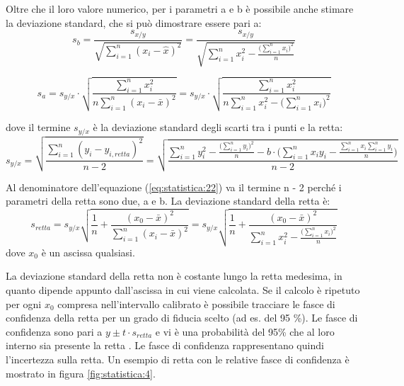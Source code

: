 Oltre che il loro valore numerico, per i parametri a e b è possibile anche stimare la deviazione standard, che si può dimostrare essere pari a:
\begin{equation} \label{eq:statistica:20}
s_b = \frac{s_{x/y}}{\sqrt{\sum_{i=1}^n (x_i - \hat{x})^2}} = \frac{s_{x/y}}{\sqrt{\sum_{i=1}^n x_i^2 - \frac{\biggl(\sum_{i=1}^n x_i \biggr)^2}{n}}}
\end{equation}

\begin{equation} \label{eq:statistica:21}
s_a = s_{y/x} \cdot \sqrt{\frac{\sum_{i=1}^n x_i^2}{n \sum_{i=1}^n (x_i - \bar{x})^2}} = s_{y/x} \cdot \sqrt{\frac{\sum_{i=1}^n x_i^2}{n \sum_{i=1}^n x_i^2 - \biggl(\sum_{i=1}^n x_i \biggr)^2}}
\end{equation}

dove il termine $s_{y/x}$ è la deviazione standard degli scarti tra i punti e la retta:
\begin{equation} \label{eq:statistica:22}
s_{y/x} = \sqrt{\frac{\sum_{i=1}^n (y_i - y_{i,retta})^2}{n-2}} = \sqrt{\frac{\sum_{i=1}^n y_i^2 - \frac{\biggl(\sum_{i=1}^n y_i\biggr)^2}{n} - b\cdot \Biggr(\sum_{i=1}^n x_i y_i - \frac{\sum_{i=1}^n x_i \sum_{i=1}^n y_i}{n}\Biggr)}{n-2}}
\end{equation}

Al denominatore dell'equazione (\ref{eq:statistica:22}) va il termine n - 2 perché i parametri della retta sono due, a e b. La deviazione standard della retta è:
\begin{equation} \label{eq:statistica:23}
s_{retta} = s_{y/x} \sqrt{\frac{1}{n} + \frac{(x_0 - \bar{x})^2}{\sum_{i=1}^n (x_i - \bar{x})^2}} = s_{y/x} \sqrt{\frac{1}{n} + \frac{(x_0 - \bar{x})^2}{\sum_{i=1}^n x_i^2 - \frac{\biggl(\sum_{i=1}^n x_i\biggr)^2}{n}}}
\end{equation}
dove $x_0$ è un ascissa qualsiasi.

La deviazione standard della retta non è costante lungo la retta medesima, in quanto dipende appunto dall'ascissa in cui viene calcolata. Se il calcolo è ripetuto per ogni $x_0$ compresa nell'intervallo calibrato è possibile tracciare le fasce di confidenza della retta per un grado di fiducia scelto (ad es. del 95 \%). Le fasce di confidenza sono pari a $y \pm t\cdot s_{retta}$ e vi è una probabilità del 95\% che al loro interno sia presente la retta . Le fasce di confidenza rappresentano quindi l'incertezza sulla retta. Un esempio di retta con le relative fasce di confidenza è mostrato in figura \ref{fig:statistica:4}.

